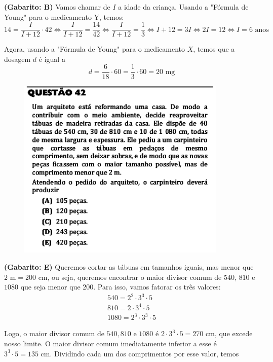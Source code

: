 \documentclass[a4paper]{article}
\begin{document}
\par\textbf{(Gabarito: B)} Vamos chamar de $I$ a idade da criança. Usando a "Fórmula de Young" para o medicamento Y, temos:
\begin{equation*}
14 = \frac{I}{I+12}\cdot 42 \iff \frac{I}{I+12} = \frac{14}{42} \iff \frac{I}{I+12} = \frac{1}{3} \iff I+12 = 3I \iff 2I = 12 \iff I = 6\text{ anos}
\end{equation*}
\par\vspace{0.3cm} Agora, usando a "Fórmula de Young" para o medicamento $X$, temos que a dosagem $d$ é igual a
\begin{equation*}
d = \frac{6}{18}\cdot 60 = \frac{1}{3}\cdot 60 = 20\text{ mg}
\end{equation*}
\begin{figure}[H]
	\begin{center}
		\includegraphics[width=10cm]{L2Q42.png}
	\end{center}
\end{figure}
\par\textbf{(Gabarito: E)} Queremos cortar as tábuas em tamanhos iguais, mas menor que $2\text{ m} = 200\text{ cm}$, ou seja, queremos encontrar o maior divisor comum de $540$, $810$ e $1080$ que seja menor que $200$. Para isso, vamos fatorar os três valores:
\begin{align*}
540 = 2^2\cdot 3^3\cdot 5\\
810 = 2\cdot 3^4\cdot 5\\
1080 = 2^3\cdot 3^3 \cdot 5
\end{align*} 
\par\vspace{0.3cm} Logo, o maior divisor comum de $540, 810$ e $1080$ é $2\cdot 3^3\cdot 5 = 270\text{ cm}$, que excede nosso limite. O maior divisor comum imediatamente inferior a esse é $3^3\cdot 5 = 135\text{ cm}$. Dividindo cada um dos comprimentos por esse valor, temos
\end{document}

